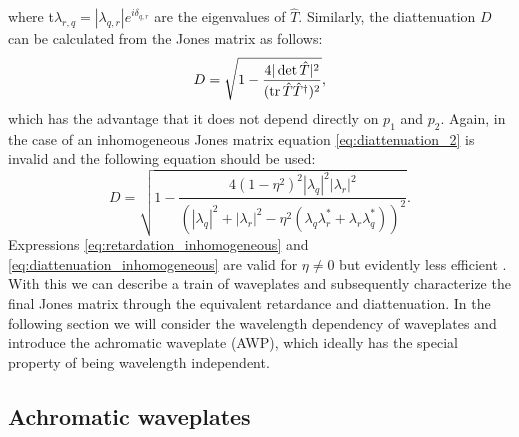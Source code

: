 where t$\lambda_{r,q}=|\lambda_{q,r}|e^{i\delta_{q,r}}$ are the eigenvalues of $\hat{T}$.
Similarly, the diattenuation $D$ can be calculated from the Jones matrix as follows:
\begin{equation}
    \label{eq:diattenuation_2}
    D=\sqrt{1-\frac{4|\det \hat{T}|^2}{(\operatorname{tr} \hat{T}\hat{T}^{\dagger})^2}},
\end{equation}
which has the advantage that it does not depend directly on $p_1$ and $p_2$. Again, in the case of an inhomogeneous Jones matrix equation \ref{eq:diattenuation_2} is invalid and the following equation should be used:
\begin{equation}
    \label{eq:diattenuation_inhomogeneous}
    D=\sqrt{1- \frac{4(1-\eta^2)^2|\lambda_q|^2|\lambda_r|^2}
    {\left(|\lambda_q|^2+|\lambda_r|^2-\eta^2(\lambda_q\lambda_r^*+\lambda_r\lambda_q^*)\right)^2}}.
\end{equation}
Expressions \ref{eq:retardation_inhomogeneous} and \ref{eq:diattenuation_inhomogeneous} are valid for $\eta \neq 0$ but evidently less efficient \cite{Lu1994HomogeneousMatrices}. With this we can describe a train of waveplates and subsequently characterize the final Jones matrix through the equivalent retardance and diattenuation. In the following section we will consider the wavelength dependency of waveplates and introduce the achromatic waveplate (AWP), which ideally has the special property of being wavelength independent. 

\subsection{Achromatic waveplates}
\label{sec:achromatic_waveplates}

